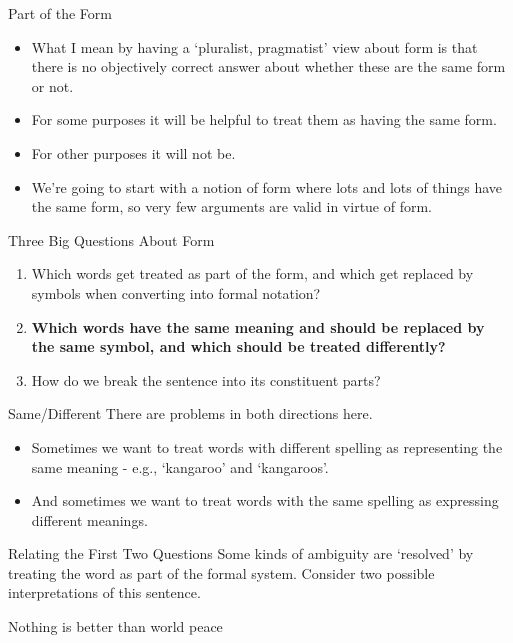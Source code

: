 \documentclass[
  ignorenonframetext,
]{beamer}
\providecommand{\tightlist}{%
  \setlength{\itemsep}{0pt}\setlength{\parskip}{0pt}}
\renewcommand{\,}{\text{, }}
\renewenvironment*{quote}	
	{\list{}{\rightmargin   \leftmargin} \item } 	
	{\endlist }
\begin{document}
\begin{frame}{Part of the Form}
\protect\hypertarget{part-of-the-form-3}{}
\begin{itemize}
\tightlist
\item
  What I mean by having a `pluralist, pragmatist' view about form is
  that there is no objectively correct answer about whether these are
  the same form or not.
\item
  For some purposes it will be helpful to treat them as having the same
  form.
\item
  For other purposes it will not be.
\item
  We're going to start with a notion of form where lots and lots of
  things have the same form, so very few arguments are valid in virtue
  of form.
\end{itemize}
\end{frame}

\begin{frame}{Three Big Questions About Form}
\protect\hypertarget{three-big-questions-about-form-1}{}
\begin{enumerate}
\tightlist
\item
  Which words get treated as part of the form, and which get replaced by
  symbols when converting into formal notation?
\item
  \textbf{Which words have the same meaning and should be replaced by
  the same symbol, and which should be treated differently?}
\item
  How do we break the sentence into its constituent parts?
\end{enumerate}
\end{frame}

\begin{frame}{Same/Different}
\protect\hypertarget{samedifferent}{}
There are problems in both directions here.

\begin{itemize}
\tightlist
\item
  Sometimes we want to treat words with different spelling as
  representing the same meaning - e.g., `kangaroo' and `kangaroos'.
\item
  And sometimes we want to treat words with the same spelling as
  expressing different meanings.
\end{itemize}
\end{frame}

\begin{frame}{Relating the First Two Questions}
\protect\hypertarget{relating-the-first-two-questions}{}
Some kinds of ambiguity are `resolved' by treating the word as part of
the formal system. Consider two possible interpretations of this
sentence.

\begin{quote}
Nothing is better than world peace
\end{quote}
\end{frame}
\end{document}
